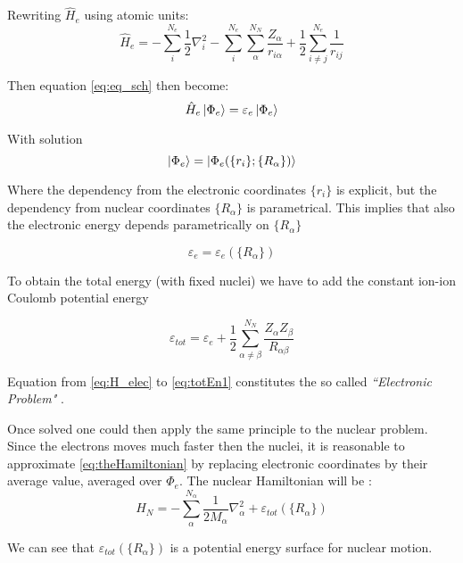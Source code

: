 \documentclass[a4paper,12pt]{article}
\begin{document}
Rewriting $\hat{H}_{e}$  using atomic units:
\begin{equation}\label{eq:H_elec}
	\hat{H}_{e} = 	- \sum_{i}^{N_{e}} \frac{1}{2} \nabla_{i}^2  
					- \sum_{i}^{N_{e}} \sum_{\alpha}^{N_{N}} \frac{Z_{\alpha}}{r_{i\alpha}}  
					+ \frac{1}{2} \sum_{i \neq j}^{N_{e}} \frac{1}{r_{ij}}
\end{equation}

Then equation \eqref{eq:eq_sch} then become:
\begin{equation}
	\hat{H}_{e} \ket{\Phi_{e}} = \varepsilon_{e} \ket{\Phi_{e}}
\end{equation}

With solution
\begin{equation}
	\ket{\Phi_{e}} = \ket{\Phi_{e}( \{r_{i}\};\{R_{\alpha}\} )}
\end{equation}

Where the dependency from the electronic coordinates $\{r_i\}$ is explicit, but the dependency from nuclear coordinates $\{R_{\alpha}\}$ is parametrical.
This implies that also the electronic energy depends parametrically on $\{R_{\alpha}\}$

\begin{equation}
	\varepsilon_{e} = \varepsilon_{e}(\{R_{\alpha}\})
\end{equation}

To obtain the total energy (with fixed nuclei) we have to add the constant ion-ion Coulomb potential energy

\begin{equation}\label{eq:totEn1}
	\varepsilon_{tot} = \varepsilon_{e} + \frac{1}{2} \sum_{\alpha \neq \beta}^{N_N} \frac{Z_{\alpha} Z_{\beta} }{R_{\alpha \beta}}
\end{equation}

Equation from \eqref{eq:H_elec} to \eqref{eq:totEn1} constitutes the so called \textit{``Electronic Problem"} \cite[p.44]{Attila}.

Once solved one could then apply the same principle to the nuclear problem.
Since the electrons moves much faster then the nuclei, it is reasonable to approximate \eqref{eq:theHamiltonian} by replacing electronic coordinates by their average value, averaged over $\Phi_{e}$.
The nuclear Hamiltonian will be :
\begin{equation}
	H_{N} = - \sum_{\alpha}^{N_{\alpha}} \frac{1}{2M_{\alpha}} \nabla_{\alpha}^2 + \varepsilon_{tot}(\{ R_{\alpha}\})
\end{equation}

We can see that $\varepsilon_{tot}(\{ R_{\alpha}\})$ is a potential energy surface for nuclear motion.
\end{document}
